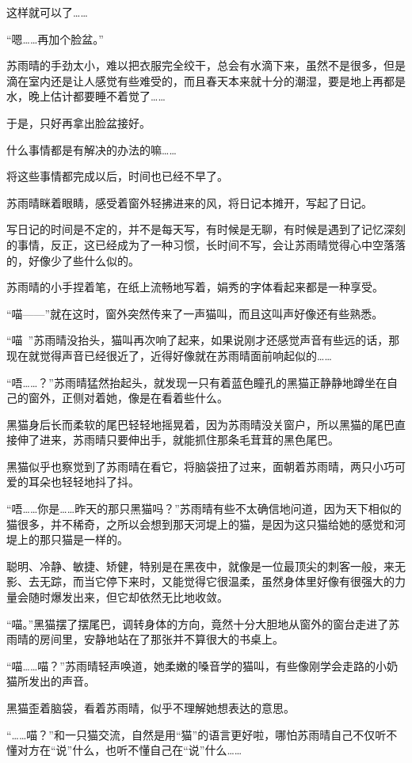 这样就可以了……

“嗯……再加个脸盆。”

苏雨晴的手劲太小，难以把衣服完全绞干，总会有水滴下来，虽然不是很多，但是滴在室内还是让人感觉有些难受的，而且春天本来就十分的潮湿，要是地上再都是水，晚上估计都要睡不着觉了……

于是，只好再拿出脸盆接好。

什么事情都是有解决的办法的嘛……

将这些事情都完成以后，时间也已经不早了。

苏雨晴眯着眼睛，感受着窗外轻拂进来的风，将日记本摊开，写起了日记。

写日记的时间是不定的，并不是每天写，有时候是无聊，有时候是遇到了记忆深刻的事情，反正，这已经成为了一种习惯，长时间不写，会让苏雨晴觉得心中空落落的，好像少了些什么似的。

苏雨晴的小手捏着笔，在纸上流畅地写着，娟秀的字体看起来都是一种享受。

“喵——”就在这时，窗外突然传来了一声猫叫，而且这叫声好像还有些熟悉。

“喵~”苏雨晴没抬头，猫叫再次响了起来，如果说刚才还感觉声音有些远的话，那现在就觉得声音已经很近了，近得好像就在苏雨晴面前响起似的……

“唔……？”苏雨晴猛然抬起头，就发现一只有着蓝色瞳孔的黑猫正静静地蹲坐在自己的窗外，正侧对着她，像是在看着些什么。

黑猫身后长而柔软的尾巴轻轻地摇晃着，因为苏雨晴没关窗户，所以黑猫的尾巴直接伸了进来，苏雨晴只要伸出手，就能抓住那条毛茸茸的黑色尾巴。

黑猫似乎也察觉到了苏雨晴在看它，将脑袋扭了过来，面朝着苏雨晴，两只小巧可爱的耳朵也轻轻地抖了抖。

“唔……你是……昨天的那只黑猫吗？”苏雨晴有些不太确信地问道，因为天下相似的猫很多，并不稀奇，之所以会想到那天河堤上的猫，是因为这只猫给她的感觉和河堤上的那只猫是一样的。

聪明、冷静、敏捷、矫健，特别是在黑夜中，就像是一位最顶尖的刺客一般，来无影、去无踪，而当它停下来时，又能觉得它很温柔，虽然身体里好像有很强大的力量会随时爆发出来，但它却依然无比地收敛。

“喵。”黑猫摆了摆尾巴，调转身体的方向，竟然十分大胆地从窗外的窗台走进了苏雨晴的房间里，安静地站在了那张并不算很大的书桌上。

“喵……喵？”苏雨晴轻声唤道，她柔嫩的嗓音学的猫叫，有些像刚学会走路的小奶猫所发出的声音。

黑猫歪着脑袋，看着苏雨晴，似乎不理解她想表达的意思。

“……喵？”和一只猫交流，自然是用“猫”的语言更好啦，哪怕苏雨晴自己不仅听不懂对方在“说”什么，也听不懂自己在“说”什么……

